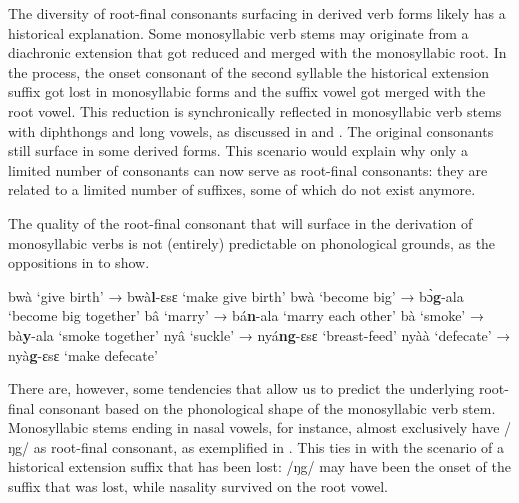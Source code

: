 The diversity of root-final consonants surfacing in derived verb forms likely has a historical explanation. Some monosyllabic verb stems may originate from a diachronic extension that got reduced and merged with the monosyllabic root. In the process, the onset consonant of the second syllable \textendash the historical extension suffix \textendash got lost in monosyllabic forms and the suffix vowel got merged with the root vowel.  This reduction is synchronically reflected in monosyllabic verb stems with diphthongs and long vowels, as discussed in  and . The original consonants still surface in some derived forms. This scenario would explain why only a limited number of consonants can now serve as root-final consonants: they are related to a limited number of suffixes, some of which do not exist anymore.

The quality of the root-final consonant that will surface in the derivation of monosyllabic verbs is not (entirely) predictable on  phonological grounds, as the oppositions in  to  show.

\ea \label{RFC0}
  \ea  bwà `give birth'  → bwà{\bfseries l}-ɛsɛ `make give birth'
\ex bwà `become big' → bɔ̀{\bfseries g}-ala `become big together'
\z
\ex \label{RFC1}
  \ea  bâ `marry'  → bá{\bfseries n}-ala `marry each other'
\ex bà `smoke' → bà{\bfseries y}-ala `smoke together'
\z
\ex\label{RFC2}
  \ea  nyâ `suckle'  → nyá{\bfseries ng}-ɛsɛ `breast-feed'
\ex nyàà `defecate' → nyà{\bfseries g}-ɛsɛ `make defecate'
\z
\z

\noindent There are, however, some tendencies that allow us to predict the underlying root-final consonant based on the phonological shape of the monosyllabic verb stem.  
Monosyllabic stems ending in nasal vowels, for instance, almost exclusively have /ŋg/ as root-final consonant, as exemplified in . This ties in with the scenario of a historical extension suffix that has been lost: /ŋg/ may have been the onset of the suffix that was lost, while nasality survived on the root vowel.


